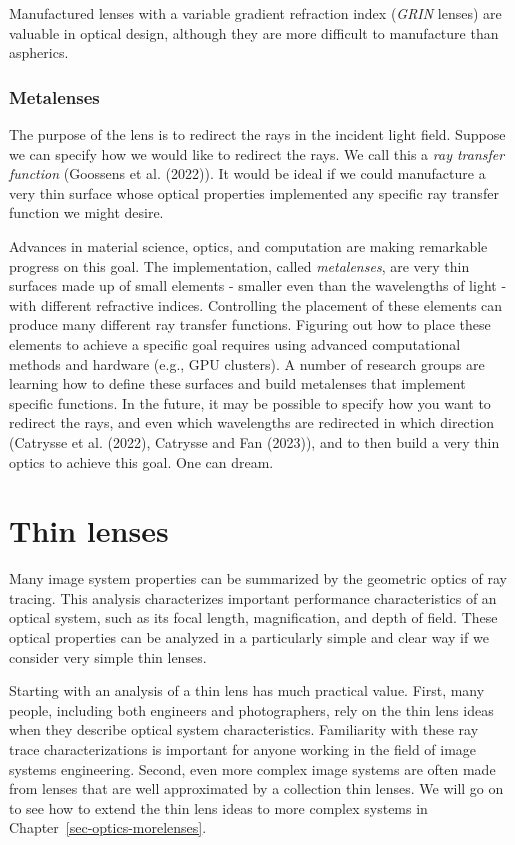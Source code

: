 \documentclass[
  letterpaper,
]{book}
\begin{document}
Manufactured lenses with a variable gradient refraction index
(\emph{GRIN} lenses) are valuable in optical design, although they are
more difficult to manufacture than aspherics.

\subsection{Metalenses}\label{sec-optics-metalens}

The purpose of the lens is to redirect the rays in the incident light
field. Suppose we can specify how we would like to redirect the rays. We
call this a \emph{ray transfer function} (Goossens et al. (2022)). It
would be ideal if we could manufacture a very thin surface whose optical
properties implemented any specific ray transfer function we might
desire.

Advances in material science, optics, and computation are making
remarkable progress on this goal. The implementation, called
\emph{metalenses}, are very thin surfaces made up of small elements -
smaller even than the wavelengths of light - with different refractive
indices. Controlling the placement of these elements can produce many
different ray transfer functions. Figuring out how to place these
elements to achieve a specific goal requires using advanced
computational methods and hardware (e.g., GPU clusters). A number of
research groups are learning how to define these surfaces and build
metalenses that implement specific functions. In the future, it may be
possible to specify how you want to redirect the rays, and even which
wavelengths are redirected in which direction (Catrysse et al. (2022),
Catrysse and Fan (2023)), and to then build a very thin optics to
achieve this goal. One can dream.

\chapter{Thin lenses}\label{sec-optics-thinlens}

Many image system properties can be summarized by the geometric optics
of ray tracing. This analysis characterizes important performance
characteristics of an optical system, such as its focal length,
magnification, and depth of field. These optical properties can be
analyzed in a particularly simple and clear way if we consider very
simple thin lenses.

Starting with an analysis of a thin lens has much practical value.
First, many people, including both engineers and photographers, rely on
the thin lens ideas when they describe optical system characteristics.
Familiarity with these ray trace characterizations is important for
anyone working in the field of image systems engineering. Second, even
more complex image systems are often made from lenses that are well
approximated by a collection thin lenses. We will go on to see how to
extend the thin lens ideas to more complex systems in
Chapter~\ref{sec-optics-morelenses}.
\end{document}
